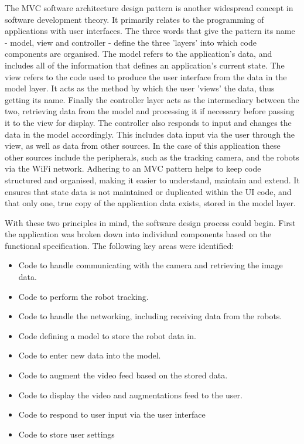 The MVC software architecture design pattern is another widespread concept in software development theory. It primarily relates to the programming of applications with user interfaces. The three words that give the pattern its name - model, view and controller - define the three 'layers' into which code components are organised. The model refers to the application's data, and includes all of the information that defines an application's current state. The view refers to the code used to produce the user interface from the data in the model layer. It acts as the method by which the user 'views' the data, thus getting its name. Finally the controller layer acts as the intermediary between the two, retrieving data from the model and processing it if necessary before passing it to the view for display. The controller also responds to input and changes the data in the model accordingly. This includes data input via the user through the view, as well as data from other sources. In the case of this application these other sources include the peripherals, such as the tracking camera, and the robots via the WiFi network. Adhering to an MVC pattern helps to keep code structured and organised, making it easier to understand, maintain and extend. It ensures that state data is not maintained or duplicated within the UI code, and that only one, true copy of the application data exists, stored in the model layer.

With these two principles in mind, the software design process could begin. First the application was broken down into individual components based on the functional specification. The following key areas were identified:

\begin{itemize}
\item Code to handle communicating with the camera and retrieving the image data.
\item Code to perform the robot tracking.
\item Code to handle the networking, including receiving data from the robots.
\item Code defining a model to store the robot data in.
\item Code to enter new data into the model.
\item Code to augment the video feed based on the stored data.
\item Code to display the video and augmentations feed to the user.
\item Code to respond to user input via the user interface
\item Code to store user settings
\end{itemize}

